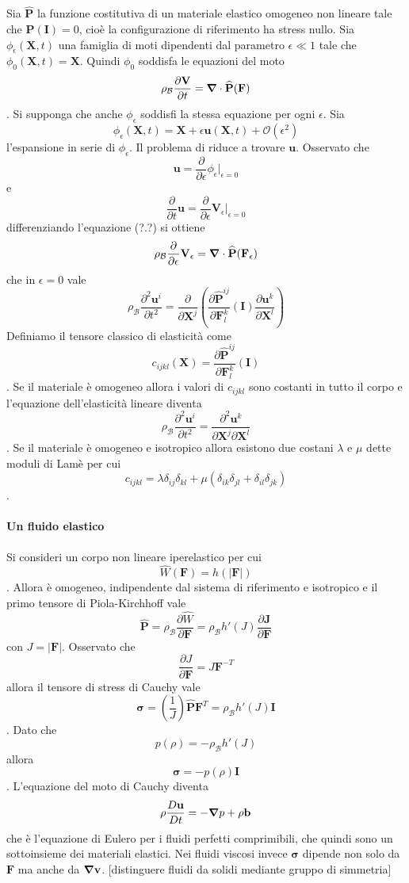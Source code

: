 Sia $\widehat{\mathbf{P}}$ la funzione costitutiva di un materiale elastico omogeneo non lineare tale che $\widehat{\mathbf{P}}(\mathbf{I})=0$, cioè la configurazione di riferimento ha stress nullo.
Sia $\phi_\epsilon(\mathbf{X},t)$ una famiglia di moti dipendenti dal parametro $\epsilon \ll1$ tale che $\phi_0(\mathbf{X},t) = \mathbf{X}$. Quindi $\phi_0$ soddisfa le equazioni del moto
$$\rho_\mathcal{B}\frac{\partial \mathbf{V}}{\partial t} = \boldsymbol{\nabla}\cdot\widehat{\mathbf{P}}(\mathbf{F}) $$.
Si supponga che anche $\phi_\epsilon$ soddisfi la stessa equazione per ogni $\epsilon$.
Sia 
$$\phi_\epsilon(\mathbf{X},t) = \mathbf{X}+\epsilon\mathbf{u}(\mathbf{X},t) + \mathcal{O}(\epsilon^2)$$
l'espansione in serie di $\phi_\epsilon$.
Il problema di riduce a trovare $\mathbf{u}$.
Osservato che 
$$\mathbf{u}=\frac{\partial}{\partial \epsilon}\phi_\epsilon \big|_{\epsilon=0}$$
e
$$\frac{\partial}{\partial t}\mathbf{u}=\frac{\partial}{\partial \epsilon}\mathbf{V}_\epsilon \big|_{\epsilon=0}$$
differenziando l'equazione (?.?) si ottiene
$$\rho_{\mathcal{B}} \frac{\partial}{\partial \epsilon}\mathbf{V}_\epsilon = \boldsymbol{\nabla}\cdot\widehat{\mathbf{P}}(\mathbf{F_\epsilon)}$$
che in $\epsilon=0$ vale
$$\rho_{\mathcal{B}} \frac{\partial^2\mathbf{u}^i}{\partial t^2} = \frac{\partial}{\partial \mathbf{X}^j}(\frac{\partial\widehat{\mathbf{P}}^{ij}}{\partial\mathbf{F}^k_l}(\mathbf{I})\frac{\partial\mathbf{u}^k}{\partial\mathbf{X}^l})$$
Definiamo il tensore classico di elasticità come
$$ c_{ijkl}(\mathbf{X})= \frac{\partial\widehat{\mathbf{P}}^{ij}}{\partial\mathbf{F}^k_l}(\mathbf{I})$$.
Se il materiale è omogeneo allora i valori di $c_{ijkl}$ sono costanti in tutto il corpo e l'equazione dell'elasticità lineare diventa
$$\rho_{\mathcal{B}} \frac{\partial^2\mathbf{u}^i}{\partial t^2} = \frac{\partial^2\mathbf{u}^k}{\partial\mathbf{X}^j\partial\mathbf{X}^l}$$.
Se il materiale è omogeneo e isotropico allora esistono due costani $\lambda$ e $\mu$ dette moduli di Lamè per cui
$$c_{ijkl}=\lambda\delta_{ij}\delta_{kl}+\mu(\delta_{ik}\delta_{jl}+\delta_{il}\delta_{jk})$$.
\paragraph{Un fluido elastico}
Si consideri un corpo non lineare iperelastico per cui
$$\widehat{W}(\mathbf{F}) = h(|\mathbf{F}|)$$.
Allora è omogeneo, indipendente dal sistema di riferimento e isotropico e il primo tensore di Piola-Kirchhoff vale
$$\widehat{\mathbf{P}}=\rho_{\mathcal{B}}\frac{\partial \widehat{W}}{\partial \mathbf{F}} = \rho_{\mathcal{B}}h'(J)\frac{\partial \mathbf{J}}{\partial \mathbf{F}}$$
con $J = |\mathbf{F}|$.
Osservato che 
$$\frac{\partial J}{\partial \mathbf{F}} = J\mathbf{F}^{-T}$$
allora il tensore di stress di Cauchy vale
$$\boldsymbol{\sigma}=(\frac{1}{J})\widehat{\mathbf{P}}\mathbf{F}^{T}=\rho_{\mathcal{B}}h'(J)\mathbf{I}$$.
Dato che
$$p(\rho)=-\rho_{\mathcal{B}}h'(J)$$
allora
$$\boldsymbol{\sigma}=-p(\rho)\mathbf{I}$$.
L'equazione del moto di Cauchy diventa
$$\rho\frac{D \mathbf{u}}{Dt} = -\boldsymbol{\nabla} p+\rho\mathbf{b}$$
che è l'equazione di Eulero per i fluidi perfetti comprimibili, che quindi sono un sottoinsieme dei materiali elastici.
Nei fluidi viscosi invece $\boldsymbol{\sigma}$ dipende non solo da $\mathbf{F}$ ma anche da $\boldsymbol{\nabla}\mathbf{v}$.
[distinguere fluidi da solidi mediante gruppo di simmetria]
